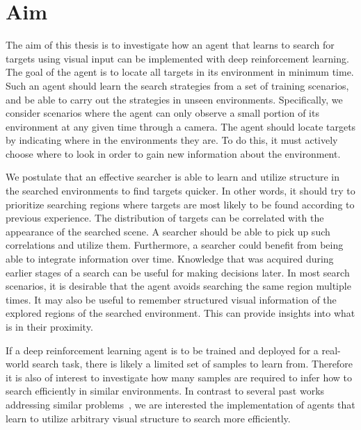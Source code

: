 \section{Aim}
\label{sec:aim}

The aim of this thesis is to investigate how an agent that learns to search for targets using visual input can be implemented with deep reinforcement learning.
The goal of the agent is to locate all targets in its environment in minimum time.
Such an agent should learn the search strategies from a set of training scenarios, and be able to carry out the strategies in unseen environments.
Specifically, we consider scenarios where the agent can only observe a small portion of its environment at any given time through a camera.
The agent should locate targets by indicating where in the environments they are.
To do this, it must actively choose where to look in order to gain new information about the environment.

We postulate that an effective searcher is able to learn and utilize structure in the searched environments to find targets quicker.
In other words, it should try to prioritize searching regions where targets are most likely to be found according to previous experience.
The distribution of targets can be correlated with the appearance of the searched scene.
A searcher should be able to pick up such correlations and utilize them.
Furthermore, a searcher could benefit from being able to integrate information over time.
Knowledge that was acquired during earlier stages of a search can be useful for making decisions later.
In most search scenarios, it is desirable that the agent avoids searching the same region multiple times.
It may also be useful to remember structured visual information of the explored regions of the searched environment.
This can provide insights into what is in their proximity.

If a deep reinforcement learning agent is to be trained and deployed for a real-world search task, there is likely a limited set of samples to learn from.
Therefore it is also of interest to investigate how many samples are required to infer how to search efficiently in similar environments.
In contrast to several past works addressing similar problems~\cite{minut_reinforcement_2001,mirowski_learning_2017,ourselin_artificial_2016,caicedo_active_2015,shubina_visual_2010,forssen_informed_2008},
we are interested the implementation of agents that learn to utilize arbitrary visual structure to search more efficiently.

